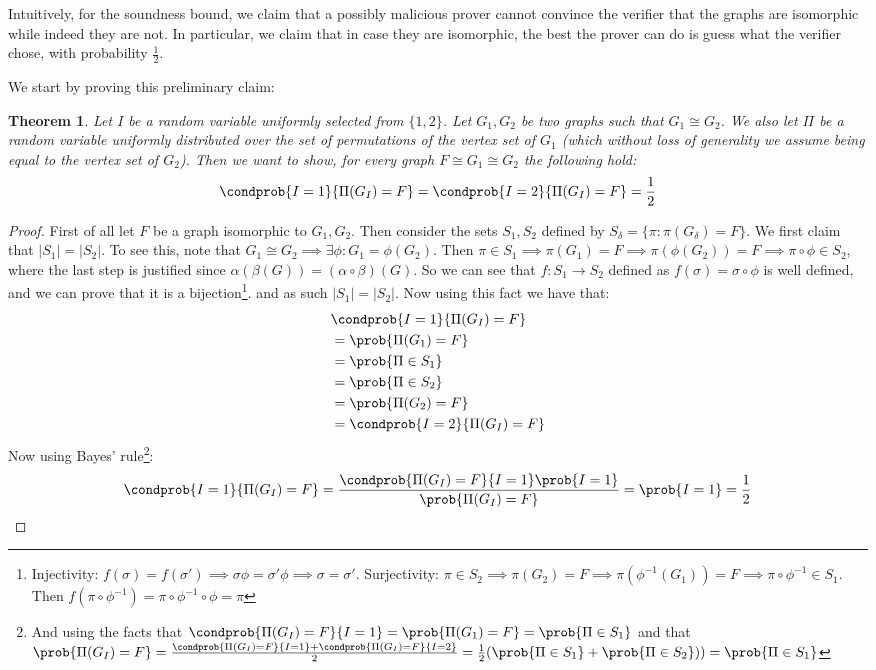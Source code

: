 \documentclass{article}
\newtheorem{theorem}{Theorem}
\begin{document}
Intuitively, for the soundness bound, we claim that a possibly malicious prover cannot convince the verifier that the graphs are isomorphic while indeed they are not. In particular, we claim that in case they are isomorphic, the best the prover can do is guess what the verifier chose, with probability $\frac{1}{2}$.

We start by proving this preliminary claim:

\begin{theorem}
Let $I$ be a random variable uniformly selected from $\{1, 2\}$. Let $G_1, G_2$ be two graphs such that $G_1 \cong G_2$. We also let $\Pi$ be a random variable uniformly distributed over the set of permutations of the vertex set of $G_1$ (which without loss of generality we assume being equal to the vertex set of $G_2$). Then we want to show, for every graph $F \cong G_1 \cong G_2$ the following hold:
\[ \condprob{I = 1}{\Pi(G_I) = F} = \condprob{I = 2}{\Pi(G_I) = F} = \frac{1}{2} \]
\end{theorem}
\begin{proof}
First of all let $F$ be a graph isomorphic to $G_1, G_2$. 
Then consider the sets $S_1, S_2$ defined by $S_\delta = \{ \pi : \pi(G_\delta) = F \}$. We first claim that $|S_1| = |S_2|$. To see this, note that $G_1 \cong G_2 \implies \exists \phi : G_1 = \phi(G_2) $. Then $\pi \in S_1 \implies \pi(G_1) = F \implies \pi(\phi(G_2)) = F \implies \pi \circ \phi \in S_2$, where the last step is justified since $\alpha(\beta(G)) = (\alpha \circ \beta) (G)$. So we can see that $f: S_1 \to S_2$ defined as $f(\sigma) = \sigma \circ \phi$ is well defined, and we can prove that it is a bijection\footnote{Injectivity: $f(\sigma) = f(\sigma') \implies \sigma \phi = \sigma' \phi \implies \sigma = \sigma'$. Surjectivity: $\pi \in S_2 \implies \pi(G_2) = F \implies \pi (\phi ^ {-1} (G_1)) = F \implies \pi \circ \phi^{-1} \in S_1$. Then $f(\pi \circ \phi^{-1}) = \pi \circ \phi^{-1} \circ \phi = \pi$}. and as such $|S_1| = |S_2|$. Now using this fact we have that:
\begin{align*}
    & \condprob{I = 1}{\Pi(G_I) = F} \\
    &= \prob{\Pi(G_1) = F }  \\
    &= \prob{\Pi \in S_1} \\
    &= \prob{\Pi \in S_2} \\
    &= \prob{\Pi(G_2) = F }  \\
    &= \condprob{I = 2}{\Pi(G_I) = F} 
\end{align*}
Now using Bayes' rule\footnote{And using the facts that $ \condprob{\Pi(G_I) = F}{I = 1} = \prob{\Pi(G_1) = F} = \prob{\Pi \in S_1}$ and that 
$\prob{\Pi(G_I) = F} = \frac{\condprob{\Pi(G_I) = F }{I = 1} + \condprob{\Pi(G_I) = F}{I = 2}}{2} = \frac{1}{2}(\prob{\Pi \in S_1} + \prob{\Pi \in S_2})) = \prob{\Pi \in S_1}$}:
\[ \condprob{I = 1}{\Pi(G_I) = F} = \frac{\condprob{\Pi(G_I) = F}{I = 1} \prob{I = 1}}{\prob{\Pi(G_I) = F}}  = \prob{I = 1} = \frac{1}{2}\] 

\end{proof}
\end{document}
